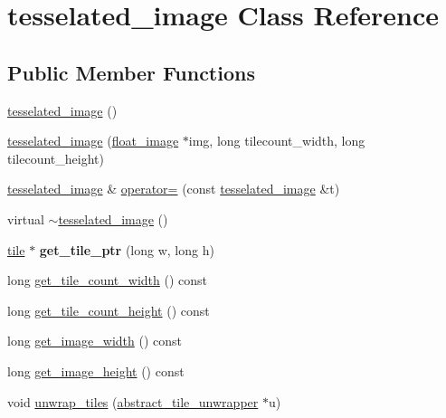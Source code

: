 \hypertarget{classtesselated__image}{\section{tesselated\-\_\-image Class Reference}
\label{classtesselated__image}
}
\subsection*{Public Member Functions}
\begin{DoxyCompactItemize}
\item 
\hyperlink{classtesselated__image_a1046281f75fe41cd2395a26501c66c58}{tesselated\-\_\-image} ()
\item 
\hyperlink{classtesselated__image_a5ef32c85dbef869e3900a1d392c75662}{tesselated\-\_\-image} (\hyperlink{classfloat__image}{float\-\_\-image} $\ast$img, long tilecount\-\_\-width, long tilecount\-\_\-height)
\item 
\hyperlink{classtesselated__image}{tesselated\-\_\-image} \& \hyperlink{classtesselated__image_a253d97eb08831fdd271ba9c17d4da839}{operator=} (const \hyperlink{classtesselated__image}{tesselated\-\_\-image} \&t)
\item 
virtual \hyperlink{classtesselated__image_a0a5a7d1c9308ff5a381318e9be86944b}{$\sim$tesselated\-\_\-image} ()
\item 
\hypertarget{classtesselated__image_a61c89b7273500466cd229fc661262f3c}{\hyperlink{classtile}{tile} $\ast$ {\bfseries get\-\_\-tile\-\_\-ptr} (long w, long h)}\label{classtesselated__image_a61c89b7273500466cd229fc661262f3c}

\item 
long \hyperlink{classtesselated__image_a1a7dc52ce1d15494037c66fce2aea0a6}{get\-\_\-tile\-\_\-count\-\_\-width} () const 
\item 
long \hyperlink{classtesselated__image_ad7a9bc565d36ca41b7f373b3961ec8ce}{get\-\_\-tile\-\_\-count\-\_\-height} () const 
\item 
long \hyperlink{classtesselated__image_a091cf518fa74ff390f42e478253c6bf1}{get\-\_\-image\-\_\-width} () const 
\item 
long \hyperlink{classtesselated__image_a3316c95c95608fc1877225fac2db0c96}{get\-\_\-image\-\_\-height} () const 
\item 
void \hyperlink{classtesselated__image_a07e8990c014aea7fbb3e0ee7d3a7ebd2}{unwrap\-\_\-tiles} (\hyperlink{classabstract__tile__unwrapper}{abstract\-\_\-tile\-\_\-unwrapper} $\ast$u)
\end{DoxyCompactItemize}
